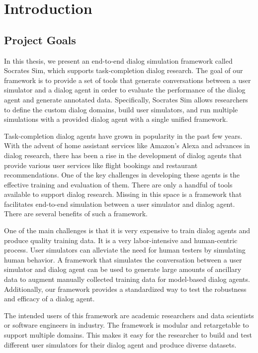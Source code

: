 \chapter{Introduction}

\section{Project Goals}

In this thesis, we present an end-to-end dialog simulation framework called Socrates Sim, which supports task-completion dialog research. The goal of our framework is to provide a set of tools that generate conversations between a user simulator and a dialog agent in order to evaluate the performance of the dialog agent and generate annotated data. Specifically, Socrates Sim allows researchers to define the custom dialog domains, build user simulators, and run multiple simulations with a provided dialog agent with a single unified framework. 

Task-completion dialog agents have grown in popularity in the past few years. With the advent of home assistant services like Amazon's Alexa and advances in dialog research, there has been a rise in the development of dialog agents that provide various user services like flight bookings and restaurant recommendations. One of the key challenges in developing these agents is the effective training and evaluation of them. There are only a handful of tools available to support dialog research. Missing in this space is a framework that facilitates end-to-end simulation between a user simulator and dialog agent. There are several benefits of such a framework.

One of the main challenges is that it is very expensive to train dialog agents and produce quality training data. It is a very labor-intensive and human-centric process. User simulators can alleviate the need for human testers by simulating human behavior. A framework that simulates the conversation between a user simulator and dialog agent can be used to generate large amounts of ancillary data to augment manually collected training data for model-based dialog agents. Additionally, our framework provides a standardized way to test the robustness and efficacy of a dialog agent.

The intended users of this framework are academic researchers and data scientists or software engineers in industry. The framework is modular and retargetable to support multiple domains. This makes it easy for the researcher to build and test different user simulators for their dialog agent and produce diverse datasets. 

